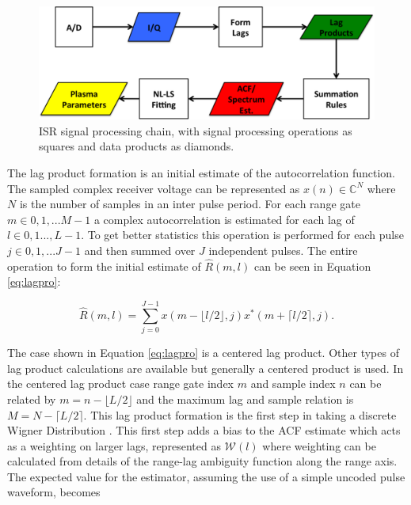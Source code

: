 \documentclass[draft,ras]{agutex}
\begin{document}
\begin{article}
\begin{figure}[!t]
\centering
\includegraphics[width=6in]{datastackchain}
\caption{ISR signal processing chain, with signal processing operations as squares and data products as diamonds.}
\label{fig:chain}
\end{figure}


The lag product formation is an initial estimate of the autocorrelation function. The sampled complex receiver voltage can be represented as $x(n) \in\mathbb{C}^N$ where $N$ is the number of samples in an inter pulse period. For each range gate $m\in 0,1,...M-1$ a complex autocorrelation is estimated for each lag of $l \in 0,1...,L-1$.  To get better statistics this operation is performed for each pulse $j\in 0,1,...J-1$ and then summed over $J$ independent pulses. The entire operation to form the initial estimate of $\widehat{R}(m,l)$ can be seen in Equation \ref{eq:lagpro}:

\begin{equation}
\label{eq:lagpro}
\widehat{R}(m,l) = \displaystyle\sum\limits_{j=0}^{J-1} x(m-\lfloor l/2\rfloor,j)x^*(m+\lceil l/2 \rceil,j).
\end{equation}

The case shown in Equation \ref{eq:lagpro} is a centered lag product.  Other types of lag product calculations are available but generally a centered product is used. In the centered lag product case range gate index $m$ and sample index $n$ can be related by $m=n-\lfloor L/2\rfloor$ and the maximum lag and sample relation is $M=N-\lceil L/2 \rceil$.  This lag product formation is the first step in taking a discrete Wigner Distribution \citep{TFAcohen}. This first step adds a bias to the ACF estimate which acts as a weighting on larger lags, represented as $\mathcal{W}(l)$ where weighting can be calculated from details of the range-lag ambiguity function along the range axis. The expected value for the estimator, assuming the use of a simple uncoded pulse waveform, becomes


\end{article}
\end{document}
